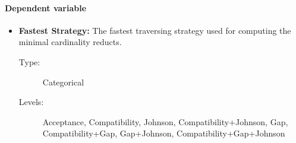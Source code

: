 \documentclass[11pt]{article}   %
\begin{document}
    \paragraph{Dependent variable}  
  	\begin{itemize}
  	   \item \textbf{Fastest Strategy:} The fastest traversing strategy used for computing the minimal cardinality
  	   								    reducts.
  	   		\begin{description}
  	   			\item[Type:] Categorical
  	   			\item[Levels:] Acceptance, Compatibility, Johnson, Compatibility+Johnson, Gap, Compatibility+Gap,
  	   						   Gap+Johnson, Compatibility+Gap+Johnson
  	   		\end{description}
    \end{itemize}
  
\end{document}

